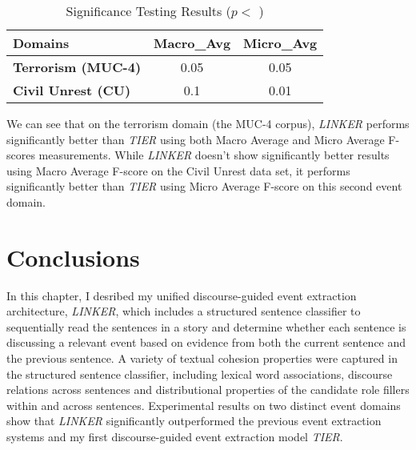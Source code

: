 \begin{table}[t]
\small
\centering
\begin{tabular}[center]{|l|cc|} \hline
{\bf Domains} & {\bf Macro\_Avg} & {\bf Micro\_Avg} \\ \hline

{\bf Terrorism (MUC-4)} & 0.05 & 0.05 \\ \hline

{\bf Civil Unrest (CU)} & 0.1 & 0.01 \\ \hline
\end{tabular}
\caption{Significance Testing Results ($p<$ )}
\label{significance-testing-results}
\end{table}




We can see that on the terrorism domain (the MUC-4 corpus), 
{\it LINKER} performs significantly better than {\it TIER} using 
both Macro Average and Micro Average F-scores measurements. 
While {\it LINKER} doesn't show significantly better results
using Macro Average F-score on the Civil Unrest data set, it performs 
significantly better than {\it TIER} using Micro Average F-score on this 
second event domain.

\section{Conclusions}

In this chapter, I desribed my unified discourse-guided 
event extraction architecture, {\it LINKER}, which includes 
a structured sentence classifier to 
sequentially read the sentences in a story and determine whether
each sentence is discussing a relevant event 
based on evidence from both the current 
sentence and the previous sentence. 
A variety of textual cohesion properties were captured 
in the structured sentence classifier, 
including lexical word
associations, discourse relations across sentences and 
distributional properties of the candidate role fillers within
and across sentences. 
Experimental results on two distinct event domains 
show that {\it LINKER} significantly outperformed 
the previous event extraction systems and my first 
discourse-guided event extraction model {\it TIER}.




